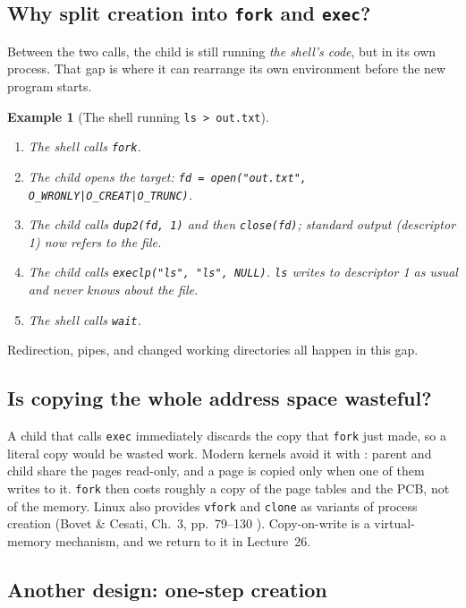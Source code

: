 \documentclass[11pt]{article}
\newtheorem{example}{Example}
\begin{document}
\subsection{Why split creation into \texttt{fork} and \texttt{exec}?}

Between the two calls, the child is still running \emph{the shell's code}, but
in its own process. That gap is where it can rearrange its own environment
before the new program starts.

\begin{example}[The shell running \texttt{ls > out.txt}]
\label{ex:redirect}
\begin{enumerate}
  \item The shell calls \texttt{fork}.
  \item The child opens the target:
    \texttt{fd = open("out.txt", O\_WRONLY|O\_CREAT|O\_TRUNC)}.
  \item The child calls \texttt{dup2(fd, 1)} and then \texttt{close(fd)};
    standard output (descriptor 1) now refers to the file.
  \item The child calls \texttt{execlp("ls", "ls", NULL)}. \texttt{ls} writes
    to descriptor 1 as usual and never knows about the file.
  \item The shell calls \texttt{wait}.
\end{enumerate}
\end{example}

\noindent Redirection, pipes, and changed working directories all happen in
this gap.

\subsection{Is copying the whole address space wasteful?}

A child that calls \texttt{exec} immediately discards the copy that
\texttt{fork} just made, so a literal copy would be wasted work. Modern kernels
avoid it with : parent and child share the pages read-only,
and a page is copied only when one of them writes to it. \texttt{fork} then
costs roughly a copy of the page tables and the PCB, not of the memory. Linux
also provides \texttt{vfork} and \texttt{clone} as variants of process creation
(Bovet \& Cesati, Ch.~3, pp.~79--130
\cite{BovetCesati_understanding_linux_kernel}). Copy-on-write is a
virtual-memory mechanism, and we return to it in Lecture~26.

\subsection{Another design: one-step creation}
\end{document}
